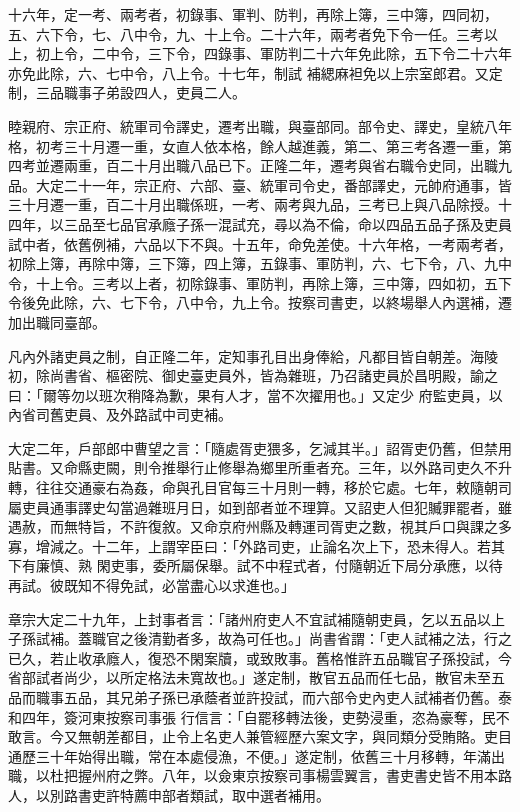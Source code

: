 \begin{pinyinscope}
 十六年，定一考、兩考者，初錄事、軍判、防判，再除上簿，三中簿，四同初，五、六下令，七、八中令，九、十上令。二十六年，兩考者免下令一任。三考以上，初上令，二中令，三下令，四錄事、軍防判二十六年免此除，五下令二十六年亦免此除，六、七中令，八上令。十七年，制試
 補緦麻袒免以上宗室郎君。又定制，三品職事子弟設四人，吏員二人。



 睦親府、宗正府、統軍司令譯史，遷考出職，與臺部同。部令史、譯史，皇統八年格，初考三十月遷一重，女直人依本格，餘人越進義，第二、第三考各遷一重，第四考並遷兩重，百二十月出職八品已下。正隆二年，遷考與省右職令史同，出職九品。大定二十一年，宗正府、六部、臺、統軍司令史，番部譯史，元帥府通事，皆三十月遷一重，百二十月出職係班，一考、兩考與九品，三考已上與八品除授。十四年，以三品至七品官承廕子孫一混試充，尋以為不倫，命以四品五品子孫及吏員
 試中者，依舊例補，六品以下不與。十五年，命免差使。十六年格，一考兩考者，初除上簿，再除中簿，三下簿，四上簿，五錄事、軍防判，六、七下令，八、九中令，十上令。三考以上者，初除錄事、軍防判，再除上簿，三中簿，四如初，五下令後免此除，六、七下令，八中令，九上令。按察司書吏，以終場舉人內選補，遷加出職同臺部。



 凡內外諸吏員之制，自正隆二年，定知事孔目出身俸給，凡都目皆自朝差。海陵初，除尚書省、樞密院、御史臺吏員外，皆為雜班，乃召諸吏員於昌明殿，諭之曰：「爾等勿以班次稍降為歉，果有人才，當不次擢用也。」又定少
 府監吏員，以內省司舊吏員、及外路試中司吏補。



 大定二年，戶部郎中曹望之言：「隨處胥吏猥多，乞減其半。」詔胥吏仍舊，但禁用貼書。又命縣吏闕，則令推舉行止修舉為鄉里所重者充。三年，以外路司吏久不升轉，往往交通豪右為姦，命與孔目官每三十月則一轉，移於它處。七年，敕隨朝司屬吏員通事譯史勾當過雜班月日，如到部者並不理算。又詔吏人但犯贓罪罷者，雖遇赦，而無特旨，不許復敘。又命京府州縣及轉運司胥吏之數，視其戶口與課之多寡，增減之。十二年，上謂宰臣曰：「外路司吏，止論名次上下，恐未得人。若其下有廉慎、熟
 閑吏事，委所屬保舉。試不中程式者，付隨朝近下局分承應，以待再試。彼既知不得免試，必當盡心以求進也。」



 章宗大定二十九年，上封事者言：「諸州府吏人不宜試補隨朝吏員，乞以五品以上子孫試補。蓋職官之後清勤者多，故為可任也。」尚書省謂：「吏人試補之法，行之已久，若止收承廕人，復恐不閑案牘，或致敗事。舊格惟許五品職官子孫投試，今省部試者尚少，以所定格法未寬故也。」遂定制，散官五品而任七品，散官未至五品而職事五品，其兄弟子孫已承蔭者並許投試，而六部令史內吏人試補者仍舊。泰和四年，簽河東按察司事張
 行信言：「自罷移轉法後，吏勢浸重，恣為豪奪，民不敢言。今又無朝差都目，止令上名吏人兼管經歷六案文字，與同類分受賄賂。吏目通歷三十年始得出職，常在本處侵漁，不便。」遂定制，依舊三十月移轉，年滿出職，以杜把握州府之弊。八年，以僉東京按察司事楊雲翼言，書吏書史皆不用本路人，以別路書吏許特薦申部者類試，取中選者補用。




\end{pinyinscope}
